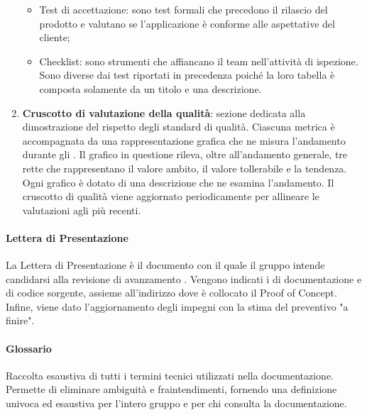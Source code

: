 \begin{enumerate}
\begin{itemize}
    \item Test di accettazione: sono test formali che precedono il rilascio del prodotto e valutano se l’applicazione è conforme alle aspettative del cliente;
    \item Checklist: sono strumenti che affiancano il team nell'attività di ispezione. Sono diverse dai test riportati in precedenza poiché la loro tabella è composta solamente da un titolo e una descrizione.
  \end{itemize}
  \item \textbf{Cruscotto di valutazione della qualità}: sezione dedicata alla dimostrazione del rispetto degli standard di qualità. Ciascuna metrica è accompagnata da una rappresentazione grafica che ne misura l'andamento durante gli . Il grafico in questione rileva, oltre all'andamento generale, tre rette che rappresentano il valore ambito, il valore tollerabile e la tendenza. Ogni grafico è dotato di una descrizione che ne esamina l'andamento. Il cruscotto di qualità viene aggiornato periodicamente per allineare le valutazioni agli  più recenti.
\end{enumerate}

\paragraph{Lettera di Presentazione}
\par La Lettera di Presentazione è il documento con il quale il gruppo intende candidarsi alla revisione di avanzamento \RTB. Vengono indicati i  di documentazione e di codice sorgente, assieme all'indirizzo dove è collocato il Proof of Concept. Infine, viene dato l'aggiornamento degli impegni con la stima del preventivo "a finire".

\paragraph{Glossario}
\par Raccolta esaustiva di tutti i termini tecnici utilizzati nella documentazione. Permette di eliminare ambiguità e fraintendimenti, fornendo una definizione univoca ed esaustiva per l'intero gruppo e per chi consulta la documentazione.

